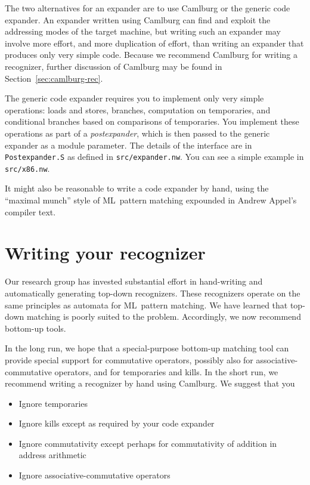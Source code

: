 \documentclass[12pt]{article}
\begin{document}
The two alternatives for an expander are to use Camlburg or the
generic code expander.
An expander written using Camlburg can find and exploit the
addressing modes of the target machine, but writing such an expander
may involve more effort, and more duplication of effort, than writing
an expander that produces only very simple code.
Because we recommend Camlburg for writing a recognizer, further
discussion of Camlburg may be found in Section~\ref{sec:camlburg-rec}.

The generic code expander requires you to implement only very simple
operations: loads and stores, branches, computation on temporaries, and
conditional branches based on comparisons of temporaries.
You implement these operations as part of a \emph{postexpander}, which
is then passed to the generic expander as a module parameter.
The details of the interface are in \texttt{Postexpander.S} as
defined in \texttt{src/expander.nw}.
You can see a simple example in \texttt{src/x86.nw}.

It might also be reasonable to write a code expander by hand, using
the ``maximal munch'' style of ML~pattern matching expounded in Andrew
Appel's compiler text.

\section{Writing your recognizer}

Our research group has invested substantial effort in hand-writing and
automatically generating top-down recognizers.
These recognizers operate on the same principles as automata for
ML~pattern matching.
We have learned that top-down matching is poorly suited to the
problem.
Accordingly, we now recommend bottom-up tools.

\label{sec:camlburg-rec}

In the long run, we hope that a special-purpose bottom-up matching
tool can provide special support for commutative operators, possibly
also for
associative-commutative operators, and for
temporaries and kills.
In the short run, we recommend writing a recognizer by hand using
Camlburg.
We suggest that you
\begin{itemize}
\item
Ignore temporaries
\item
Ignore kills except as required by your code expander
\item
Ignore commutativity except perhaps for commutativity of addition in
address arithmetic
\item
Ignore associative-commutative operators
\end{itemize}
\end{document}
